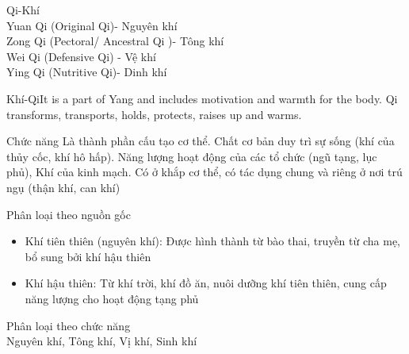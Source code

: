 \documentclass[
	11pt, %
]{beamer}
\theoremstyle{newblock}
\begin{document}
\begin{frame}[plain]
	\Huge{Qi-Khí}\\
	\Large {Yuan Qi (Original Qi)- Nguyên khí \\
	Zong Qi (Pectoral/ Ancestral Qi )- Tông khí \\
	Wei Qi (Defensive Qi) - Vệ khí \\
	Ying Qi (Nutritive Qi)- Dinh khí \\
	}

\end{frame}
\begin{frame}{Khí-Qi}{It is a part of Yang and includes motivation and warmth for the body. Qi transforms, transports, holds, protects, raises up and warms.}
	\begin{block}{Chức năng}
		Là thành phần cấu tạo cơ thể. Chất cơ bản duy trì sự sống (khí của thủy cốc, khí hô hấp). Năng lượng hoạt động của các tổ chức (ngũ tạng, lục phủ), Khí của kinh mạch. Có ở khắp cơ thể, có tác dụng chung và riêng ở nơi trú ngụ (thận khí, can khí)
	\end{block}
	\Large{Phân loại theo nguồn gốc}\\
	\normalsize{
	\begin{itemize}
		\item Khí tiên thiên (nguyên khí): Được hình thành từ bào thai, truyền từ cha mẹ, bổ sung bởi khí hậu thiên
		\item Khí hậu thiên: Từ khí trời, khí đồ ăn, nuôi dưỡng khí tiên thiên, cung cấp năng lượng cho hoạt động tạng phủ
	\end{itemize}
	}
	\Large{Phân loại theo chức năng}\\
	\normalsize{
	Nguyên khí, Tông khí, Vị khí, Sinh khí}
\end{frame}
\end{document}
